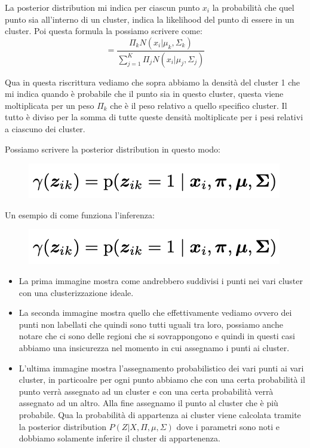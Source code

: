 \documentclass[14pt]{extreport}
\begin{document}
La posterior distribution mi indica per ciascun punto $x_i$ la probabilità che quel punto sia all'interno di un cluster, indica la likelihood del punto 
di essere in un cluster.
Poi questa formula la possiamo scrivere come:
$$= \frac{\Pi_k N(x_i|\mu_k, \Sigma_k)}{\sum_{j=1}^K \Pi_j N(x_i | \mu_j, \Sigma_j)}$$

Qua in questa riscrittura vediamo che sopra abbiamo la densità del cluster 1 che mi indica quando è probabile che il punto sia in questo cluster, questa
viene moltiplicata per un peso $\Pi_k$ che è il peso relativo a quello specifico cluster.
Il tutto è diviso per la somma di tutte queste densità moltiplicate per i pesi relativi a ciascuno dei cluster.

Possiamo scrivere la posterior distribution in questo modo:

\begin{figure}[H] 
\centering
\includegraphics[width=0.7\linewidth]{546.jpeg}
\end{figure}

Un esempio di come funziona l'inferenza:


\begin{figure}[H] 
\centering
\includegraphics[width=0.7\linewidth]{546.jpeg}
\end{figure}

\begin{itemize}
\item La prima immagine mostra come andrebbero suddivisi i punti nei vari cluster con una clusterizzazione ideale.
\item La seconda immagine mostra quello che effettivamente vediamo ovvero dei punti non labellati che quindi sono tutti uguali tra loro, possiamo
anche notare che ci sono delle regioni che si sovrappongono e quindi in questi casi abbiamo una insicurezza nel momento in cui assegnamo i punti ai cluster.
\item L'ultima immagine mostra l'assegnamento probabilistico dei vari punti ai vari cluster, in particoalre per ogni punto abbiamo che con una certa probabilità
il punto verrà assegnato ad un cluster e con una certa probabilità verrà assegnato ad un altro. Alla fine assegnamo il punto al cluster che è più probabile.
Qua la probabilità di appartenza ai cluster viene calcolata tramite la posterior distribution $P(Z|X,\Pi, \mu, \Sigma)$ dove i parametri sono noti e dobbiamo
solamente inferire il cluster di appartenenza.
\end{itemize}
\end{document}
